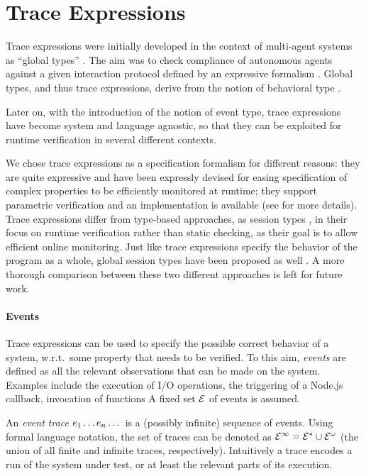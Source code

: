 \section{Trace Expressions}
\label{sec:trace}
Trace expressions were initially developed in the context of multi-agent systems as ``global types'' \cite{AnconaDM12}.
The aim was to check compliance of autonomous agents against a given interaction protocol defined by an expressive formalism \cite{AnconaBFMT14, BriolaMA14}.
Global types, and thus trace expressions, derive from the notion of behavioral type \cite{AnconaBB0CDGGGH16}.

Later on, with the introduction of the notion of event type, trace expressions have become system and language agnostic, so that they can be exploited for runtime verification in several different contexts.


We chose trace expressions as a specification formalism for different reasons: they are quite expressive \cite{ancona2016comparing} and have been expressly devised for easing specification of complex properties to be efficiently monitored at runtime; they support parametric verification \cite{AnconaFM17} and an implementation is available (see \cite{TowardsIoT17} for more details).
Trace expressions differ from type-based approaches, as session types \cite{sessiontypes}, in their focus on runtime verification rather than static checking, as their goal is to allow efficient online monitoring.
Just like trace expressions specify the behavior of the program as a whole, global session types have been proposed as well \cite{globalst,Vasconcelos11}.
A more thorough comparison between these two different approaches is left for future work.

\paragraph{Events}
Trace expressions can be used to specify the possible correct behavior of a system, w.r.t.\ some property that needs to be verified.
To this aim, \emph{events} are defined as all the relevant observations that can be made on the system.
Examples include the execution of I/O operations, the triggering of a Node.js callback, invocation of functions\textellipsis{} A fixed set \(\mathcal{E}\) of events is assumed.

An \emph{event trace} \(e_1\dots e_n\dots\) is a (possibly infinite) sequence of events.
Using formal language notation, the set of traces can be denoted as \(\mathcal{E}^\infty = \mathcal{E}^* \cup \mathcal{E}^\omega\) (the union of all finite and infinite traces, respectively).
Intuitively a trace encodes a run of the system under test, or at least the relevant parts of its execution.


